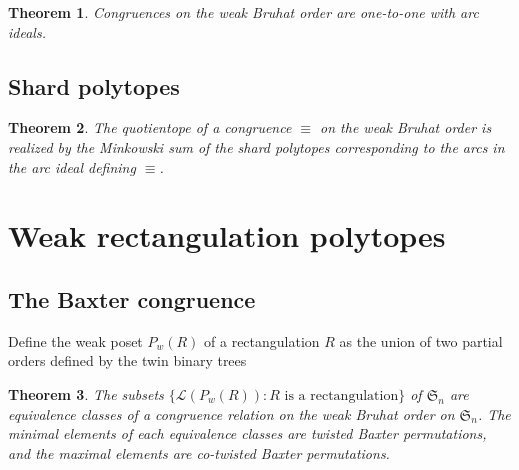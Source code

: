 \documentclass{amsart}
\newtheorem{theorem}{Theorem}%
\theoremstyle{definition}
\newcommand{\f}[1]{\mathfrak{#1}} %
\begin{document}
\begin{theorem}
  Congruences on the weak Bruhat order are one-to-one with arc ideals.
\end{theorem}

\subsection{Shard polytopes}

\begin{theorem}
  The quotientope of a congruence $\equiv$ on the weak Bruhat order is realized by the Minkowski sum of the shard polytopes corresponding to the arcs in the arc ideal defining $\equiv$.
\end{theorem}


\section{Weak rectangulation polytopes}
\label{sec:weakRectangulationPolytopes}

\subsection{The Baxter congruence}

Define the weak poset $P_w(R)$ of a rectangulation $R$ as the union of two partial orders defined by the twin binary trees

\begin{theorem}
  The subsets $\{\mathcal{L}(P_w(R)) : R \text{ is a rectangulation} \}$ of $\f{S}_n$ 
  are equivalence classes of a congruence relation on the weak Bruhat order on $\f{S}_n$.
  The minimal elements of each equivalence classes are twisted Baxter permutations, and the maximal
  elements are co-twisted Baxter permutations.
\end{theorem}
\end{document}
